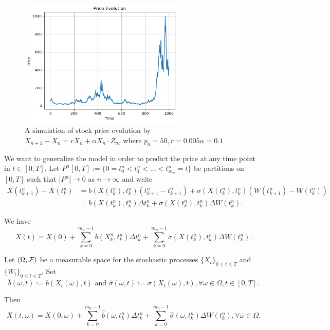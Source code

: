 \begin{figure}
  \centering
  \includegraphics[width=0.7\textwidth]{img/stock-price-sampling.png}
  \vspace{0.25cm}
  \caption[Stock price simulation]{A simulation of stock price evolution by $X_{n+1} - X_n = rX_n + \alpha X_n\cdot Z_{n}$, where $p_0=50, r = 0.005
      \alpha = 0.1$}
\end{figure}

We want to generalize the model in order to predict the price at any time point in $t\in[0,T]$. Let $P^n[0,T]:=\{0=t^n_0<t^n_1<\ldots<t^n_{m_n}=t\}$ be partitions on $[0,T]$ such that $|P^n|\to 0$ as $n\to\infty$ and write
\begin{align*}
  X(t^n_{k+1})- X(t^n_{k})
   & = b(X(t^n_{k}),t^n_{k})(t^n_{k+1} - t^n_{k+1})+ \sigma(X(t^n_{k}),t^n_{k})(W(t^n_{k+1})-W(t^n_{k})) \\
   & = b(X(t^n_{k}),t^n_{k})\Delta t^n_{k} + \sigma(X(t^n_{k}),t^n_{k})\Delta W(t^n_{k}).
\end{align*}

We have
$$X(t)=X(0)+\sum\limits_{k=0}^{m_n-1}  b(X_k^n,t_k^n)\Delta t^n_{k} + \sum\limits_{k=0}^{m_n-1} \sigma(X(t^n_{k}),t^n_{k})\Delta W(t^n_{k}).$$

Let $(\Omega, \mathcal{F})$ be a measurable space for the stochastic processes $\{X_t\}_{0\le t\le T}$ and $\{W_t\}_{0\le t\le T}$. Set
$$\hat{b}(\omega, t) :=  b(X_t(\omega),t) \text{ and } \hat{\sigma}(\omega, t) := \sigma(X_t(\omega),t), \forall \omega\in\Omega, t\in[0,T].$$

Then
\begin{equation}
  \label{equation:stochastic-limit}
  X(t,\omega)=X(0,\omega)+\sum\limits_{k=0}^{m_n-1}  \hat{b}(\omega, t_k^n)\Delta t^n_{k} + \sum\limits_{k=0}^{m_n-1} \hat{\sigma}(\omega, t_k^n)\Delta W(t^n_{k}), \forall \omega\in\Omega.
\end{equation}

